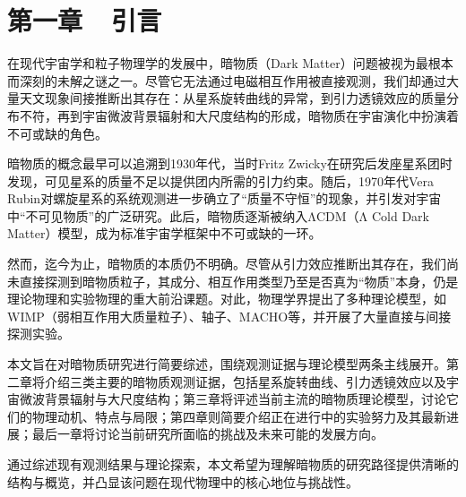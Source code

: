 \pagestyle{fancy}
\setcounter{page}{1}
\chead{}
\lfoot{}
\cfoot{\thepage}
\rfoot{}


\section*{第一章~~引言}
\setcounter{section}{1} \setcounter{subsection}{0}

在现代宇宙学和粒子物理学的发展中，暗物质（Dark Matter）问题被视为最根本而深刻的未解之谜之一。尽管它无法通过电磁相互作用被直接观测，我们却通过大量天文现象间接推断出其存在：从星系旋转曲线的异常，到引力透镜效应的质量分布不符，再到宇宙微波背景辐射和大尺度结构的形成，暗物质在宇宙演化中扮演着不可或缺的角色。

暗物质的概念最早可以追溯到1930年代，当时Fritz Zwicky在研究后发座星系团时发现，可见星系的质量不足以提供团内所需的引力约束。随后，1970年代Vera Rubin对螺旋星系的系统观测进一步确立了“质量不守恒”的现象，并引发对宇宙中“不可见物质”的广泛研究。此后，暗物质逐渐被纳入ΛCDM（Λ Cold Dark Matter）模型，成为标准宇宙学框架中不可或缺的一环。

然而，迄今为止，暗物质的本质仍不明确。尽管从引力效应推断出其存在，我们尚未直接探测到暗物质粒子，其成分、相互作用类型乃至是否真为“物质”本身，仍是理论物理和实验物理的重大前沿课题。对此，物理学界提出了多种理论模型，如WIMP（弱相互作用大质量粒子）、轴子、MACHO等，并开展了大量直接与间接探测实验。

本文旨在对暗物质研究进行简要综述，围绕观测证据与理论模型两条主线展开。第二章将介绍三类主要的暗物质观测证据，包括星系旋转曲线、引力透镜效应以及宇宙微波背景辐射与大尺度结构；第三章将评述当前主流的暗物质理论模型，讨论它们的物理动机、特点与局限；第四章则简要介绍正在进行中的实验努力及其最新进展；最后一章将讨论当前研究所面临的挑战及未来可能的发展方向。

通过综述现有观测结果与理论探索，本文希望为理解暗物质的研究路径提供清晰的结构与概览，并凸显该问题在现代物理中的核心地位与挑战性。

\newpage


